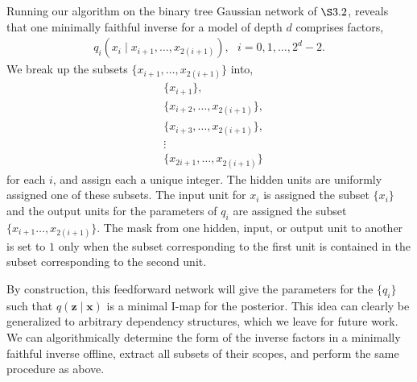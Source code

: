\documentclass{article}
\begin{document}
Running our algorithm on the binary tree Gaussian network of $\S3.2$, reveals that one minimally faithful inverse for a model of depth $d$ comprises factors,
\begin{align*}
	q_i(x_i\mid x_{i+1},\ldots,x_{2(i+1)}),\ \ \ i=0,1,\ldots,2^d-2.
\end{align*}
We break up the subsets $\{x_{i+1},\ldots,x_{2(i+1)}\}$ into,
\begin{align*}
	& \{x_{i+1}\},\\
	& \{x_{i+2},\ldots,x_{2(i+1)}\},\\
	& \{x_{i+3},\ldots,x_{2(i+1)}\},\\
	& \vdots\\
	& \{x_{2i+1},\ldots,x_{2(i+1)}\}
\end{align*}
	for each $i$, and assign each a unique integer.
The hidden units are uniformly assigned one of these subsets.
The input unit for $x_i$ is assigned the subset $\{x_i\}$ and the output units for the parameters of $q_i$ are assigned the subset $\{x_{i+1}\ldots,x_{2(i+1)}\}$.
The mask from one hidden, input, or output unit to another is set to $1$ only when the subset corresponding to the first unit is contained in the subset corresponding to the second unit.

By construction, this feedforward network will give the parameters for the $\{q_i\}$ such that $q(\mathbf{z}\mid\mathbf{x})$ is a minimal I-map for the posterior.
This idea can clearly be generalized to arbitrary dependency structures, which we leave for future work.
We can algorithmically determine the form of the inverse factors in a minimally faithful inverse offline, extract all subsets of their scopes, and perform the same procedure as above.



\vfill\pagebreak


\end{document}
